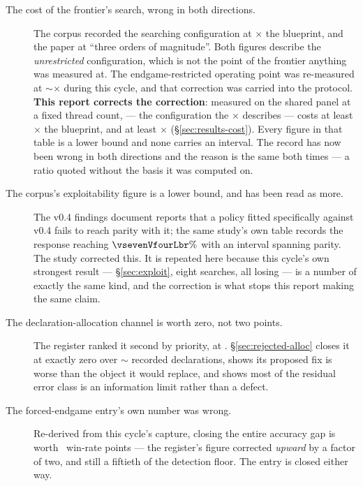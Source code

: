 \begin{description}

\item[The cost of the frontier's search, wrong in both directions.] The corpus recorded the searching configuration at \vsevenCorpusCost$\times$ the
  blueprint, and the \vsix{} paper at ``three orders of magnitude''. Both figures describe the
  \emph{unrestricted} configuration, which is not the point of the frontier anything was measured at.
  The endgame-restricted operating point was re-measured at $\sim$\vsevenCostRecorded$\times$ during
  this cycle, and that correction was carried into the protocol. \textbf{This report corrects the correction}: measured on the shared panel at a fixed thread count,
  \fcheap{} --- the configuration the \vsevenCostRecorded$\times$ describes --- costs at least
  \vsevenCostFcheapTight$\times$ the blueprint, and \frozen{} at least
  \vsevenCostFrozenTight$\times$ (\S\ref{sec:results-cost}). Every figure in that table is a lower
  bound and none carries an interval. The record has now been wrong in both directions and the reason is the
  same both times --- a ratio quoted without the basis it was computed on.

\item[The corpus's exploitability figure is a lower bound, and has been read as more.] The v0.4 findings document reports that a policy fitted
  specifically against v0.4 fails to reach parity with it; the same study's own table records the
  response reaching $\vsevenVfourLbr\%$ with an interval spanning parity. The \vsix{} study corrected this. It is
  repeated here because this cycle's own strongest result --- \S\ref{sec:exploit}, eight searches, all
  losing --- is a number of exactly the same kind, and the correction is what stops this report making
  the same claim.

\item[The declaration-allocation channel is worth zero, not two points.] The
  register ranked it second by priority, at \vsevenLonePriority{}. \S\ref{sec:rejected-alloc} closes it
  at exactly zero over $\sim$\vsevenLoneDecls{} recorded declarations, shows its proposed fix is worse
  than the object it would replace, and shows most of the residual error class is an information limit
  rather than a defect.

\item[The forced-endgame entry's own number was wrong.]
  Re-derived from this cycle's capture, closing the entire accuracy gap is worth
  \vsevenLthirteenClose{}~win-rate points --- the register's figure corrected \emph{upward} by a factor
  of two, and still a fiftieth of the detection floor. The entry is closed either way.


\end{description}
